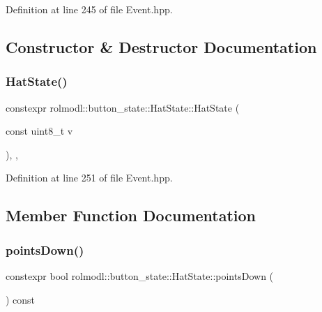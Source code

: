 Definition at line 245 of file Event.\+hpp.



\subsection{Constructor \& Destructor Documentation}
\mbox{\label{structrolmodl_1_1button__state_1_1_hat_state_ac9bc5d2d1c01e4d6fefe918f9cd51fbf}} 
\subsubsection{\texorpdfstring{HatState()}{HatState()}}
{\footnotesize\ttfamily constexpr rolmodl\+::button\+\_\+state\+::\+Hat\+State\+::\+Hat\+State (\begin{DoxyParamCaption}\item[{const uint8\+\_\+t}]{v }\end{DoxyParamCaption})\hspace{0.3cm}{\ttfamily [inline]}, {\ttfamily [explicit]}, {\ttfamily [noexcept]}}



Definition at line 251 of file Event.\+hpp.



\subsection{Member Function Documentation}
\mbox{\label{structrolmodl_1_1button__state_1_1_hat_state_a13c84cc688aa5ccc59f782f192c0b941}} 
\subsubsection{\texorpdfstring{pointsDown()}{pointsDown()}}
{\footnotesize\ttfamily constexpr bool rolmodl\+::button\+\_\+state\+::\+Hat\+State\+::points\+Down (\begin{DoxyParamCaption}{ }\end{DoxyParamCaption}) const\hspace{0.3cm}{\ttfamily [inline]}}



